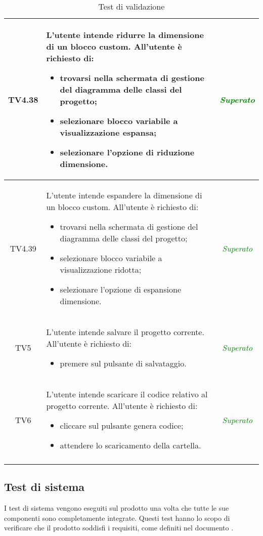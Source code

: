 \begin{longtable}{|c|>{}m{8cm}|c|}
\hypertarget{TV4.38}{TV4.38} & L'utente intende ridurre la dimensione di un blocco custom.
All'utente è richiesto di:
\begin{itemize}
	\item trovarsi nella schermata di gestione del diagramma delle classi del progetto;
	\item selezionare blocco variabile a visualizzazione espansa;
	\item selezionare l'opzione di riduzione dimensione.
\end{itemize} & \textcolor{Green}{\textit{Superato}}\\ \hline

\hypertarget{TV4.39}{TV4.39} & L'utente intende espandere la dimensione di un blocco custom.
All'utente è richiesto di:
\begin{itemize}
	\item trovarsi nella schermata di gestione del diagramma delle classi del progetto;
	\item selezionare blocco variabile a visualizzazione ridotta;
	\item selezionare l'opzione di espansione dimensione.
\end{itemize} & \textcolor{Green}{\textit{Superato}}\\ \hline

\hypertarget{TV5}{TV5} & L'utente intende salvare il progetto corrente.
All'utente è richiesto di:
\begin{itemize}
	\item premere sul pulsante di salvataggio.
\end{itemize} & \textcolor{Green}{\textit{Superato}}\\ \hline

\hypertarget{TV6}{TV6} & L'utente intende scaricare il codice relativo al progetto corrente.
All'utente è richiesto di:
\begin{itemize}
	\item cliccare sul pulsante genera codice;
	\item attendere lo scaricamento della cartella.
\end{itemize} & \textcolor{Green}{\textit{Superato}}\\ \hline
\caption[Test di validazione]{Test di validazione}
\label{tab:valid}
\end{longtable}
\clearpage


\subsection{Test di sistema}
I test di sistema vengono eseguiti sul prodotto una volta che tutte le sue componenti sono completamente integrate. Questi test hanno lo scopo di verificare che il prodotto soddisfi i requisiti, come definiti nel documento \AdR.

